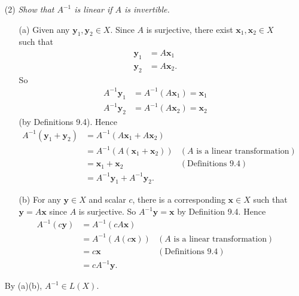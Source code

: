 \documentclass{article}
\begin{document}
\begin{enumerate}
\item[(2)]
  \emph{Show that $A^{-1}$ is linear if $A$ is invertible.}
  \begin{enumerate}
  \item[(a)]
    Given any $\mathbf{y}_1, \mathbf{y}_2 \in X$.
    Since $A$ is surjective,
    there exist $\mathbf{x}_1, \mathbf{x}_2 \in X$ such that
    \begin{align*}
      \mathbf{y}_1 &= A\mathbf{x}_1 \\
      \mathbf{y}_2 &= A\mathbf{x}_2.
    \end{align*}
    So
    \begin{align*}
      A^{-1}\mathbf{y}_1 &= A^{-1}(A\mathbf{x}_1) = \mathbf{x}_1 \\
      A^{-1}\mathbf{y}_2 &= A^{-1}(A\mathbf{x}_2) = \mathbf{x}_2
    \end{align*}
    (by Definitions 9.4).
    Hence
    \begin{align*}
      A^{-1}(\mathbf{y}_1+\mathbf{y}_2)
      &= A^{-1}(A\mathbf{x}_1+A\mathbf{x}_2) \\
      &= A^{-1}(A(\mathbf{x}_1+\mathbf{x}_2))
        & (\text{$A$ is a linear transformation}) \\
      &= \mathbf{x}_1+\mathbf{x}_2
        & (\text{Definitions 9.4}) \\
      &= A^{-1}\mathbf{y}_1+A^{-1}\mathbf{y}_2.
    \end{align*}

  \item[(b)]
    For any $\mathbf{y} \in X$ and scalar $c$,
    there is a corresponding $\mathbf{x} \in X$ such that $\mathbf{y} = A\mathbf{x}$
    since $A$ is surjective. So $A^{-1}\mathbf{y} = \mathbf{x}$ by Definition 9.4.
    Hence
    \begin{align*}
      A^{-1}(c\mathbf{y})
      &= A^{-1}(cA\mathbf{x}) \\
      &= A^{-1}(A(c\mathbf{x}))
        & (\text{$A$ is a linear transformation}) \\
      &= c\mathbf{x}
        & (\text{Definitions 9.4}) \\
      &= cA^{-1}\mathbf{y}.
    \end{align*}
  \end{enumerate}
  By (a)(b), $A^{-1} \in L(X)$.


\end{enumerate}
\end{document}
